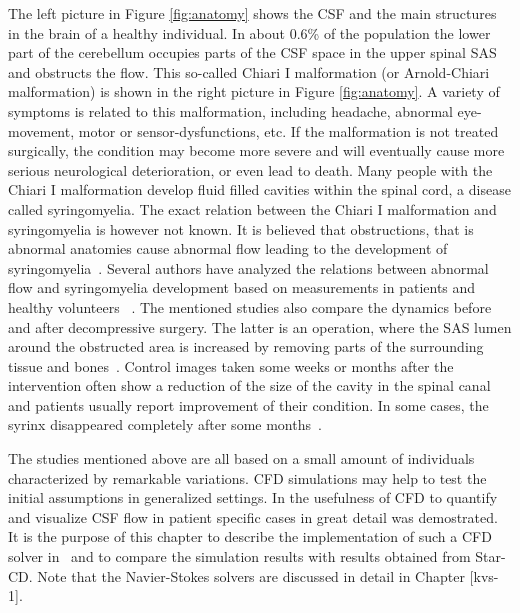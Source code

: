 The left picture in Figure \ref{fig:anatomy} shows the CSF and the
main structures in the brain of a healthy individual. In about 0.6\%
of the population the lower part of the cerebellum occupies parts of
the CSF space in the upper spinal SAS and obstructs the flow. This
so-called Chiari I malformation  (or
Arnold-Chiari malformation) is
shown in the right picture in Figure \ref{fig:anatomy}. A variety of
symptoms is related to this malformation, including headache, abnormal
eye-movement, motor or sensor-dysfunctions, etc. If the malformation
is not treated surgically, the condition may become more severe and
will eventually cause more serious neurological deterioration, or even
lead to death. Many people with the Chiari I malformation develop
fluid filled cavities within the spinal cord,  a
disease called syringomyelia. The exact
relation between the Chiari I malformation and syringomyelia is
however not known. It is believed that obstructions, that is abnormal
anatomies cause abnormal flow leading to the development of
syringomyelia~\cite{Oldfield1994}. Several authors have
analyzed the relations between abnormal flow and syringomyelia
development based on measurements in patients and healthy volunteers
~\cite{Heiss1999,Pinna2000,Hofmann2000,Haughton2003}. The mentioned
studies also compare the dynamics before and after decompressive
surgery. The latter is an operation, where the SAS lumen around the
obstructed area is increased by removing parts of the surrounding
tissue and bones~\cite{Milhorat2003}. Control
images taken some weeks or months after the intervention often show a
reduction of the size of the cavity in the spinal canal and patients
usually report improvement of their condition. In some cases, the
syrinx disappeared completely after some months~\cite{Oldfield1994,Pinna2000,Heiss1999}.

The studies mentioned above are all based on a small amount of
individuals characterized by remarkable variations. CFD simulations
may help to test the initial assumptions in generalized
settings. In \cite{Gupta2009,Roldan2008} the  
usefulness of CFD to quantify and visualize CSF flow
in patient specific cases in great detail was demostrated. 
It is the purpose of this
chapter to describe the implementation of such a CFD solver in
\fenics\ and to compare the simulation results with results obtained
from Star-CD. Note that the Navier-Stokes solvers are discussed in
detail in Chapter [kvs-1].\\

